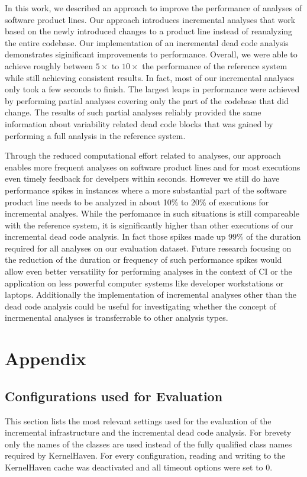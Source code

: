 \documentclass[a4paper]{article}
\begin{document}
In this work, we described an approach to improve the performance of analyses of software product lines. Our approach introduces incremental analyses that work based on the newly introduced changes to a product line instead of reanalyzing the entire codebase. Our implementation of an incremental dead code analysis demonstrates siginificant improvements to performance. Overall, we were able to achieve roughly between $5\times$ to $10\times$ the performance of the reference system while still achieving consistent results. 
In fact, most of our incremental analyses only took a few seconds to finish. The largest leaps in performance were achieved by performing partial analyses covering only the part of the codebase that did change. The results of such partial analyses reliably provided the same information about variability related dead code blocks that was gained by performing a full analysis in the reference system.

Through the reduced computational effort related to analyses, our approach enables more frequent analyses on software product lines and for most executions even timely feedback for develpers within seconds. However we still do have performance spikes in instances where a more substantial part of the software product line needs to be analyzed in about 10\% to 20\% of executions for incremental analyes. While the perfomance in such situations is still compareable with the reference system, it is significantly higher than other executions of our incremental dead code analysis. In fact those spikes made up 99\% of the duration required for all analyses on our evaluation dataset. Future research focusing on the reduction of the duration or frequency of such performance spikes would allow even better versatility for performing analyses in the context of CI or the application on less powerful computer systems like developer workstations or laptops.
Additionally the implementation of incremental analyses other than the dead code analysis could be useful for investigating whether the concept of incrmenental analyses is transferrable to other analysis types.

\clearpage
\newpage



\clearpage
\newpage
\appendix
\section{Appendix}

\subsection{Configurations used for Evaluation}
This section lists the most relevant settings used for the evaluation of the incremental infrastructure and the incremental dead code analysis. For brevety only the names of the classes are used instead of the fully qualified class names required by KernelHaven. For every configuration, reading and writing to the KernelHaven cache was deactivated and all timeout options were set to 0.
\end{document}
